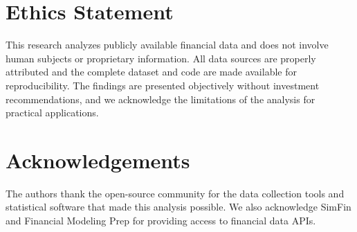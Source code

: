 \documentclass[11pt]{article}
\begin{document}
\section*{Ethics Statement}

This research analyzes publicly available financial data and does not involve human subjects or proprietary information. All data sources are properly attributed and the complete dataset and code are made available for reproducibility. The findings are presented objectively without investment recommendations, and we acknowledge the limitations of the analysis for practical applications.

\section*{Acknowledgements}

The authors thank the open-source community for the data collection tools and statistical software that made this analysis possible. We also acknowledge SimFin and Financial Modeling Prep for providing access to financial data APIs.



\end{document}
